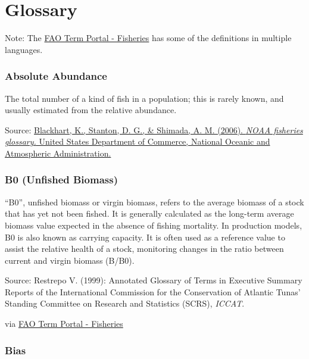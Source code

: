 \documentclass[
  11pt,
]{book}
\begin{document}
\hypertarget{glossary}{%
\chapter{Glossary}\label{glossary}}





Note: The \href{http://www.fao.org/fishery/glossary/en}{FAO Term Portal - Fisheries} has some of the definitions in multiple languages.

\hypertarget{absolute-abundance}{%
\subsection{Absolute Abundance}\label{absolute-abundance}}

The total number of a kind of ﬁsh in a population; this is rarely known, and usually estimated from the relative abundance.

Source: \href{https://repository.library.noaa.gov/view/noaa/12856}{Blackhart, K., Stanton, D. G., \& Shimada, A. M. (2006). \emph{NOAA fisheries glossary.} United States Department of Commerce, National Oceanic and Atmospheric Administration.}

\hypertarget{b0-unfished-biomass}{%
\subsection{B0 (Unfished Biomass)}\label{b0-unfished-biomass}}

``B0'', unfished biomass or virgin biomass, refers to the average biomass of a stock that has yet not been fished. It is generally calculated as the long-term average biomass value expected in the absence of fishing mortality. In production models, B0 is also known as carrying capacity. It is often used as a reference value to assist the relative health of a stock, monitoring changes in the ratio between current and virgin biomass (B/B0).

Source: Restrepo V. (1999): Annotated Glossary of Terms in Executive Summary Reports of the International Commission for the Conservation of Atlantic Tunas' Standing Committee on Research and Statistics (SCRS), \emph{ICCAT}.

via \href{http://www.fao.org/fishery/glossary/en}{FAO Term Portal - Fisheries}

\hypertarget{bias}{%
\subsection{Bias}\label{bias}}
\end{document}
